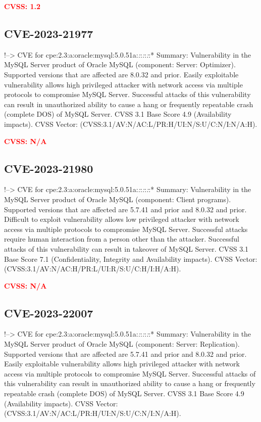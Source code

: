 \documentclass[a4paper, 12pt]{article}
\begin{document}
\textbf{\textcolor{red}{CVSS: 1.2}}

\hypertarget{cve-2023-21977}{%
\subsection{CVE-2023-21977}\label{cve-2023-21977}}

!--\textgreater{} CVE for
cpe:2.3:a:oracle:mysql:5.0.51a:\emph{:}:\emph{:}:\emph{:}:* Summary:
Vulnerability in the MySQL Server product of Oracle MySQL (component:
Server: Optimizer). Supported versions that are affected are 8.0.32 and
prior. Easily exploitable vulnerability allows high privileged attacker
with network access via multiple protocols to compromise MySQL Server.
Successful attacks of this vulnerability can result in unauthorized
ability to cause a hang or frequently repeatable crash (complete DOS) of
MySQL Server. CVSS 3.1 Base Score 4.9 (Availability impacts). CVSS
Vector: (CVSS:3.1/AV:N/AC:L/PR:H/UI:N/S:U/C:N/I:N/A:H).

\textbf{\textcolor{red}{CVSS: N/A}}

\hypertarget{cve-2023-21980}{%
\subsection{CVE-2023-21980}\label{cve-2023-21980}}

!--\textgreater{} CVE for
cpe:2.3:a:oracle:mysql:5.0.51a:\emph{:}:\emph{:}:\emph{:}:* Summary:
Vulnerability in the MySQL Server product of Oracle MySQL (component:
Client programs). Supported versions that are affected are 5.7.41 and
prior and 8.0.32 and prior. Difficult to exploit vulnerability allows
low privileged attacker with network access via multiple protocols to
compromise MySQL Server. Successful attacks require human interaction
from a person other than the attacker. Successful attacks of this
vulnerability can result in takeover of MySQL Server. CVSS 3.1 Base
Score 7.1 (Confidentiality, Integrity and Availability impacts). CVSS
Vector: (CVSS:3.1/AV:N/AC:H/PR:L/UI:R/S:U/C:H/I:H/A:H).

\textbf{\textcolor{red}{CVSS: N/A}}

\hypertarget{cve-2023-22007}{%
\subsection{CVE-2023-22007}\label{cve-2023-22007}}

!--\textgreater{} CVE for
cpe:2.3:a:oracle:mysql:5.0.51a:\emph{:}:\emph{:}:\emph{:}:* Summary:
Vulnerability in the MySQL Server product of Oracle MySQL (component:
Server: Replication). Supported versions that are affected are 5.7.41
and prior and 8.0.32 and prior. Easily exploitable vulnerability allows
high privileged attacker with network access via multiple protocols to
compromise MySQL Server. Successful attacks of this vulnerability can
result in unauthorized ability to cause a hang or frequently repeatable
crash (complete DOS) of MySQL Server. CVSS 3.1 Base Score 4.9
(Availability impacts). CVSS Vector:
(CVSS:3.1/AV:N/AC:L/PR:H/UI:N/S:U/C:N/I:N/A:H).
\end{document}
